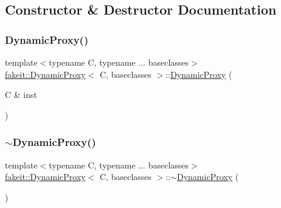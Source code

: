 \subsection{Constructor \& Destructor Documentation}
\mbox{\label{structfakeit_1_1DynamicProxy_a417e0221b7df3845b201a9e4a1f5028b}} 
\subsubsection{\texorpdfstring{DynamicProxy()}{DynamicProxy()}\hspace{0.1cm}{\footnotesize\ttfamily [1/9]}}
{\footnotesize\ttfamily template$<$typename C, typename ... baseclasses$>$ \\
\mbox{\hyperlink{structfakeit_1_1DynamicProxy}{fakeit\+::\+Dynamic\+Proxy}}$<$ C, baseclasses $>$\+::\mbox{\hyperlink{structfakeit_1_1DynamicProxy}{Dynamic\+Proxy}} (\begin{DoxyParamCaption}\item[{C \&}]{inst }\end{DoxyParamCaption})\hspace{0.3cm}{\ttfamily [inline]}}

\mbox{\label{structfakeit_1_1DynamicProxy_a05e9d9c1bcaf4bcd14d1b6311e16c809}} 
\subsubsection{\texorpdfstring{$\sim$DynamicProxy()}{~DynamicProxy()}\hspace{0.1cm}{\footnotesize\ttfamily [1/9]}}
{\footnotesize\ttfamily template$<$typename C, typename ... baseclasses$>$ \\
\mbox{\hyperlink{structfakeit_1_1DynamicProxy}{fakeit\+::\+Dynamic\+Proxy}}$<$ C, baseclasses $>$\+::$\sim$\mbox{\hyperlink{structfakeit_1_1DynamicProxy}{Dynamic\+Proxy}} (\begin{DoxyParamCaption}{ }\end{DoxyParamCaption})\hspace{0.3cm}{\ttfamily [inline]}}

